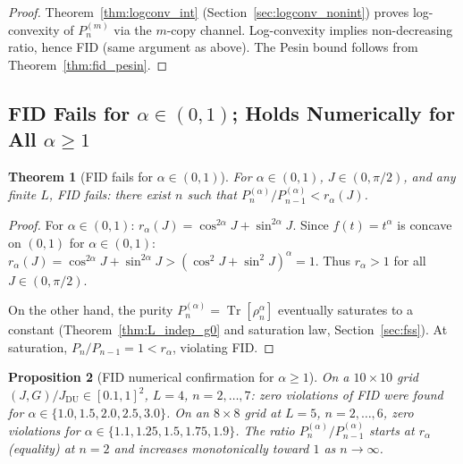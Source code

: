 \documentclass[12pt,a4paper]{article}
\newtheorem{theorem}{Theorem}[section]
\newtheorem{proposition}[theorem]{Proposition}
\begin{document}
\begin{proof}
Theorem~\ref{thm:logconv_int} (Section~\ref{sec:logconv_nonint}) proves
log-convexity of $P_n^{(m)}$ via the $m$-copy channel.
Log-convexity implies non-decreasing ratio, hence FID (same argument as above).
The Pesin bound follows from Theorem~\ref{thm:fid_pesin}.
\end{proof}

\subsection{FID Fails for $\alpha\in(0,1)$; Holds Numerically for All $\alpha\geq 1$}
\label{sec:fid_alpha_range}

\begin{theorem}[FID fails for $\alpha\in(0,1)$]
\label{thm:fid_fail_small_alpha}
For $\alpha\in(0,1)$, $J\in(0,\pi/2)$, and any finite $L$, FID fails:
there exist $n$ such that $P_n^{(\alpha)}/P_{n-1}^{(\alpha)}<r_\alpha(J)$.
\end{theorem}

\begin{proof}
For $\alpha\in(0,1)$: $r_\alpha(J)=\cos^{2\alpha}J+\sin^{2\alpha}J$.
Since $f(t)=t^\alpha$ is concave on $(0,1)$ for $\alpha\in(0,1)$:
$r_\alpha(J)=\cos^{2\alpha}J+\sin^{2\alpha}J>(\cos^2 J+\sin^2 J)^\alpha=1$.
Thus $r_\alpha>1$ for all $J\in(0,\pi/2)$.

On the other hand, the purity $P_n^{(\alpha)}=\operatorname{Tr}[\rho_n^\alpha]$
eventually saturates to a constant (Theorem~\ref{thm:L_indep_g0} and saturation
law, Section~\ref{sec:fss}).  At saturation, $P_n/P_{n-1}=1<r_\alpha$, violating FID.
\end{proof}

\begin{proposition}[FID numerical confirmation for $\alpha\geq 1$]
\label{prop:fid_numerical}
On a $10\times10$ grid $(J,G)/J_\mathrm{DU}\in[0.1,1]^2$, $L=4$, $n=2,\ldots,7$:
zero violations of FID were found for
$\alpha\in\{1.0,1.5,2.0,2.5,3.0\}$.
On an $8\times8$ grid at $L=5$, $n=2,\ldots,6$, zero violations for
$\alpha\in\{1.1,1.25,1.5,1.75,1.9\}$.
The ratio $P_n^{(\alpha)}/P_{n-1}^{(\alpha)}$ starts at $r_\alpha$ (equality)
at $n=2$ and increases monotonically toward $1$ as $n\to\infty$.
\end{proposition}
\end{document}
